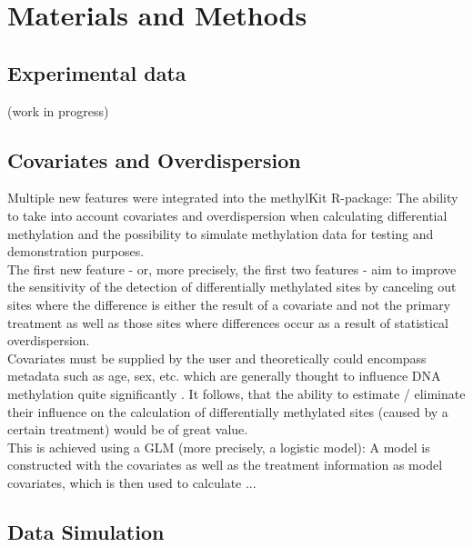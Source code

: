 \section{Materials and Methods}
\subsection{Experimental data}

(work in progress)

\subsection{Covariates and Overdispersion}

Multiple new features were integrated into the methylKit R-package: The ability to take into account covariates and overdispersion when calculating differential methylation and the possibility to simulate methylation data for testing and demonstration purposes.\\
The first new feature - or, more precisely, the first two features - aim to  improve the sensitivity of the detection of differentially methylated sites by canceling out sites where the difference is either the result of a covariate and not the primary treatment as well as those sites where differences occur as a result of statistical overdispersion.\\
Covariates must be supplied by the user and theoretically could encompass metadata such as age, sex, etc. which are generally thought to influence DNA methylation quite significantly \cite{24561809}. It follows, that the ability to estimate / eliminate their influence on the calculation of differentially methylated sites (caused by a certain treatment) would be of great value.\\
This is achieved using a GLM (more precisely, a logistic model): A model is constructed with the covariates as well as the treatment information as model covariates, which is then used to calculate ...

\subsection{Data Simulation}


